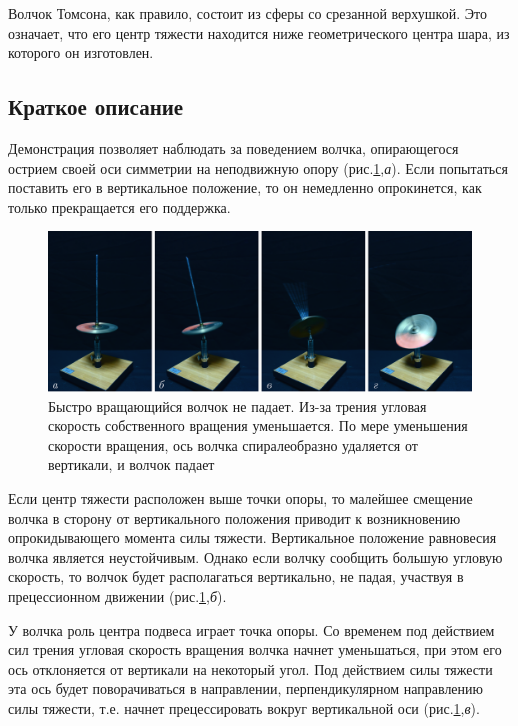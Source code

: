 Волчок Томсона, как правило, состоит из сферы со срезанной верхушкой. 
Это означает, что его центр тяжести находится ниже геометрического центра шара, из которого он изготовлен. 

	\subsection*{\textcolor{PineGreen}{Краткое описание}}
	
	Демонстрация позволяет наблюдать за поведением волчка, опирающегося острием своей оси симметрии на неподвижную опору (рис.\ref{gyro-5},\textit{а}).
	Если попытаться поставить его в вертикальное положение, то он немедленно опрокинется, как только прекращается его поддержка. 
	\begin{figure}[H] 	
		\centering 	
		\includegraphics[width=0.9\linewidth]{gyro-5.png}
		\caption{Быстро вращающийся волчок не падает. Из-за трения угловая скорость собственного вращения уменьшается. По мере уменьшения скорости вращения, ось волчка спиралеобразно удаляется от вертикали, и волчок падает}
		\label{gyro-5}
	\end{figure}
	Если центр тяжести расположен выше точки опоры, то малейшее смещение волчка в сторону от вертикального положения приводит к возникновению опрокидывающего момента силы тяжести.
	Вертикальное положение равновесия волчка является неустойчивым.
	Однако если волчку сообщить большую угловую скорость, то волчок будет располагаться вертикально, не падая, участвуя в прецессионном движении (рис.\ref{gyro-5},\textit{б}). 



У волчка роль центра подвеса играет точка опоры.
Со временем под действием сил трения угловая скорость вращения волчка начнет уменьшаться, при этом его ось отклоняется от вертикали на некоторый угол.
Под действием силы тяжести эта ось будет поворачиваться в направлении, перпендикулярном направлению силы тяжести, т.е. начнет прецессировать вокруг вертикальной оси (рис.\ref{gyro-5},\textit{в}).



